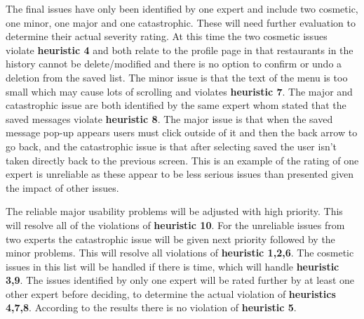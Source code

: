 \documentclass[a4 paper, 12pt]{article}
\begin{document}
     The final issues have only been identified by one expert and include two cosmetic, one minor, one major and one catastrophic. These will need further evaluation to determine their actual severity rating. At this time the two cosmetic issues violate \textbf{heuristic 4} and both relate to the profile page in that restaurants in the history cannot be delete/modified and there is no option to confirm or undo a deletion from the saved list. The minor issue is that the text of the menu is too small which may cause lots of scrolling and violates \textbf{heuristic 7}. The major and catastrophic issue are both identified by the same expert whom stated that the saved messages violate \textbf{heuristic 8}. The major issue is that when the saved message pop-up appears users must click outside of it and then the back arrow to go back, and the catastrophic issue is that after selecting saved the user isn't taken directly back to the previous screen. This is an example of the rating of one expert is unreliable as these appear to be less serious issues than presented given the impact of other issues. 

     The reliable major usability problems will be adjusted with high priority. This will resolve all of the violations of \textbf{heuristic 10}. For the unreliable issues from two experts the catastrophic issue will be given next priority followed by the minor problems. This will resolve all violations of \textbf{heuristic 1,2,6}. The cosmetic issues in this list will be handled if there is time, which will handle \textbf{heuristic 3,9}. The issues identified by only one expert will be rated further by at least one other expert before deciding, to determine the actual violation of \textbf{heuristics 4,7,8}. According to the results there is no violation of \textbf{heuristic 5}.
\end{document}

